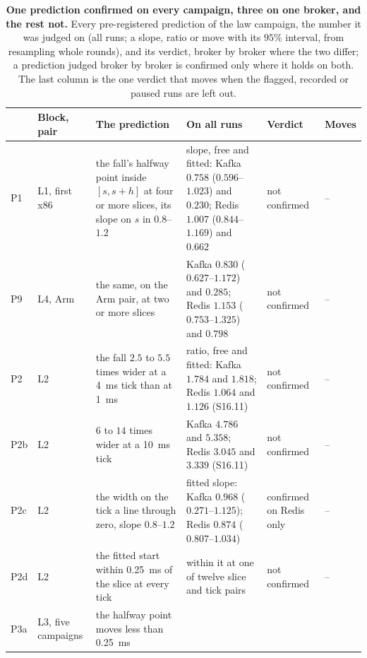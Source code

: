 \documentclass[10pt,journal,onecolumn]{IEEEtran}
\newcommand{\kafka}{Kafka}
\newcommand{\redis}{Redis}
\begin{document}
\begin{table}[htbp]
\caption{\textbf{One prediction confirmed on every campaign, three on one broker, and the rest
not.} Every pre-registered prediction of the law campaign, the number it was judged on (all runs;
a slope, ratio or move with its $95\%$ interval, from resampling whole rounds), and its verdict,
broker by broker where the two differ; a prediction judged broker by broker is confirmed only
where it holds on both. The last column is the one verdict that moves when the flagged, recorded
or paused runs are left out.}
\label{tab:lawverdicts}
\centering
\footnotesize
\begin{tabular}{@{}p{0.9cm}p{1.7cm}p{4.0cm}p{6.0cm}p{1.6cm}p{1.5cm}@{}}
\toprule
& Block, pair & The prediction & On all runs & Verdict & Moves\\
\midrule
P1 & \raggedright L1, first x86 & \raggedright the fall's halfway point inside $[s, s + h]$ at four
or more slices, its slope on $s$ in $0.8$--$1.2$ & \raggedright slope, free and fitted: \kafka{}
$0.758$ ($0.596$--$1.023$) and $0.230$; \redis{} $1.007$ ($0.844$--$1.169$) and $0.662$ &
\raggedright not confirmed & --\\
P9 & \raggedright L4, Arm & \raggedright the same, on the Arm pair, at two or more slices &
\raggedright \kafka{} $0.830$ ($0.627$--$1.172$) and $0.285$; \redis{} $1.153$
($0.753$--$1.325$) and $0.798$ & \raggedright not confirmed & --\\
P2 & \raggedright L2 & \raggedright the fall $2.5$ to $5.5$ times wider at a 4~ms tick than at
1~ms & \raggedright ratio, free and fitted: \kafka{} $1.784$ and $1.818$; \redis{} $1.064$ and
$1.126$ (S16.11) & \raggedright not confirmed & --\\
P2b & \raggedright L2 & \raggedright $6$ to $14$ times wider at a 10~ms tick & \raggedright
\kafka{} $4.786$ and $5.358$; \redis{} $3.045$ and $3.339$ (S16.11) & \raggedright not confirmed
& --\\
P2c & \raggedright L2 & \raggedright the width on the tick a line through zero, slope
$0.8$--$1.2$ & \raggedright fitted slope: \kafka{} $0.968$ ($0.271$--$1.125$); \redis{} $0.874$
($0.807$--$1.034$) & \raggedright confirmed on \redis{} only & --\\
P2d & \raggedright L2 & \raggedright the fitted start within 0.25~ms of the slice at every tick
& \raggedright within it at one of twelve slice and tick pairs & \raggedright not confirmed &
--\\
P3a & \raggedright L3, five campaigns & \raggedright the halfway point moves less than 0.25~ms

\end{tabular}
\end{table}
\end{document}
